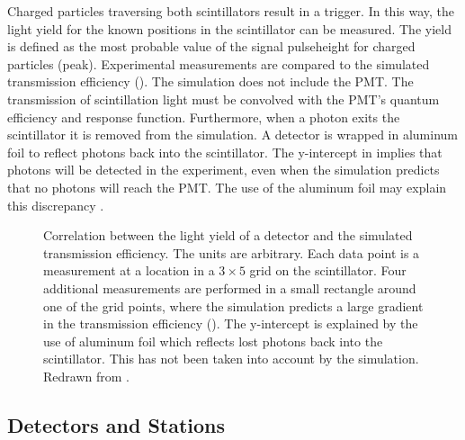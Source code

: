 Charged particles traversing both scintillators result in a trigger.
In this way, the light yield for the known positions in the scintillator can be
measured. The yield is defined as the most probable value of the signal
pulseheight for charged particles (\mip peak). Experimental measurements
are compared to the simulated transmission efficiency
(). The simulation does not include the PMT.
The transmission of scintillation light must be convolved with the PMT's quantum
efficiency and response function. Furthermore, when a photon exits the
scintillator it is removed from the simulation. A \hisparc detector is wrapped
in aluminum foil to reflect photons back into the scintillator. The y-intercept
in  implies that photons will be detected in the
experiment, even when the simulation predicts that no photons will reach the
PMT.
The use of the aluminum foil may explain this discrepancy \cite{Buisman:2011}.
\begin{figure}
\centering

\caption{Correlation between the light yield of a \hisparc detector and the
simulated transmission efficiency. The units are arbitrary. Each data point is a
measurement at a location in a $3\times 5$ grid on the scintillator. Four
additional measurements are performed in a small rectangle around one of the
grid points, where the simulation predicts a large gradient in the transmission
efficiency (). The y-intercept is explained
by the use of aluminum foil which reflects lost photons back into the
scintillator. This has not been taken into account by the simulation.
Redrawn from \cite{Buisman:2011}.}
\label{fig:exp-transmission}
\end{figure}


\subsection{Detectors and Stations}

